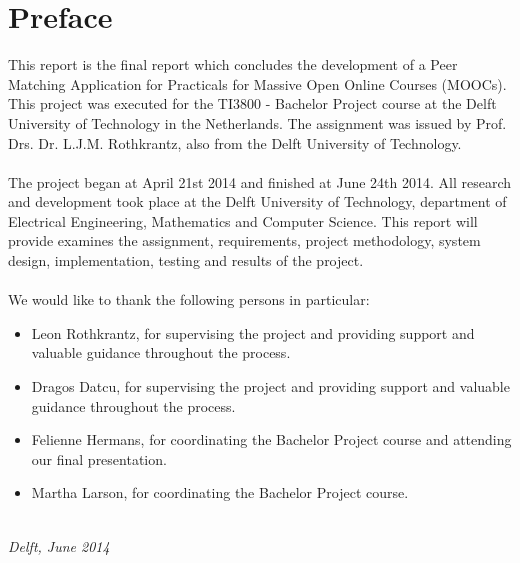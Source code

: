 \chapter*{Preface}

This report is the final report which concludes the development of a Peer Matching Application for Practicals for Massive Open Online Courses (MOOCs).
This project was executed for the TI3800 - Bachelor Project course at the Delft University of Technology in the Netherlands.
The assignment was issued by Prof. Drs. Dr. L.J.M. Rothkrantz, also from the Delft University of Technology.
\\\\
The project began at April 21st 2014 and finished at June 24th 2014. All research and development took place at the Delft University of Technology, department of Electrical Engineering, Mathematics and Computer Science. This report will provide examines the assignment, requirements, project methodology, system design, implementation, testing and results of the project.
\\\\
We would like to thank the following persons in particular:
\begin{itemize}
\item Leon Rothkrantz, for supervising the project and providing support and valuable guidance throughout the process.
\item Dragos Datcu, for supervising the project and providing support and valuable guidance throughout the process.
\item Felienne Hermans, for coordinating the Bachelor Project course and attending our final presentation.
\item Martha Larson, for coordinating the Bachelor Project course.
\end{itemize}

\begin{flushright}
{\makeatletter\itshape
    \@author \\
    Delft, June 2014
\makeatother}
\end{flushright}

